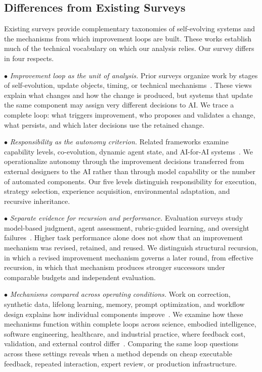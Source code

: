 \subsection{Differences from Existing Surveys}

Existing surveys provide complementary taxonomies of self-evolving systems and the mechanisms from which improvement loops are built. These works establish much of the technical vocabulary on which our analysis relies. Our survey differs in four respects.

\noindent$\bullet$ \emph{Improvement loop as the unit of analysis.} Prior surveys organize work by stages of self-evolution, update objects, timing, or technical mechanisms~\cite{tao2024selfevolution,gao2026selfevolving,fang2025selfevolving,ren2026selfimprovements}. These views explain what changes and how the change is produced, but systems that update the same component may assign very different decisions to AI. We trace a complete loop: what triggers improvement, who proposes and validates a change, what persists, and which later decisions use the retained change.

\noindent$\bullet$ \emph{Responsibility as the autonomy criterion.} Related frameworks examine capability levels, co-evolution, dynamic agent state, and AI-for-AI systems~\cite{liu2026path,zong2026coevolution,xu2026dynamicgraph,ye2026ai4ai}. We operationalize autonomy through the improvement decisions transferred from external designers to the AI rather than through model capability or the number of automated components. Our five levels distinguish responsibility for execution, strategy selection, experience acquisition, environmental adaptation, and recursive inheritance.

\noindent$\bullet$ \emph{Separate evidence for recursion and performance.} Evaluation surveys study model-based judgment, agent assessment, rubric-guided learning, and oversight failures~\cite{li2025judge,yehudai2026evaluation,shan2026rubric,kim2024superalignment,slattery2024risk}. Higher task performance alone does not show that an improvement mechanism was revised, retained, and reused. We distinguish structural recursion, in which a revised improvement mechanism governs a later round, from effective recursion, in which that mechanism produces stronger successors under comparable budgets and independent evaluation.

\noindent$\bullet$ \emph{Mechanisms compared across operating conditions.} Work on correction, synthetic data, lifelong learning, memory, prompt optimization, and workflow design explains how individual components improve~\cite{pan2024correction,venktesh2025verification,niu2026testtime,long2024synthetic,zheng2026lifelong,huang2026memory,zhou2026externalization,ramnath2025prompt,lee2025compound,yue2026workflow,li2026environment}. We examine how these mechanisms function within complete loops across science, embodied intelligence, software engineering, healthcare, and industrial practice, where feedback cost, validation, and external control differ~\cite{ding2026verificationgap,zhou2026coding,zhu2026clinical}. Comparing the same loop questions across these settings reveals when a method depends on cheap executable feedback, repeated interaction, expert review, or production infrastructure.


